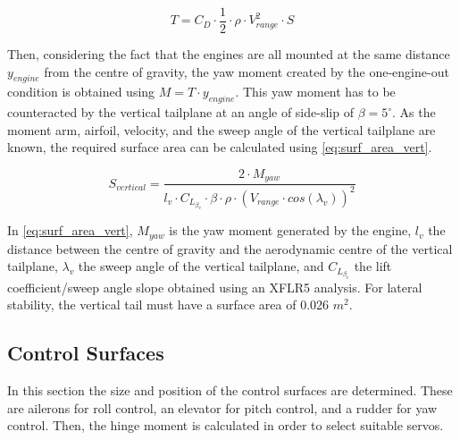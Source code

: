 \begin{equation}
    T = C_D\cdot\frac{1}{2}\cdot\rho\cdot V^2_{range}\cdot S
    \label{eq:drag_vertical}
\end{equation}

Then, considering the fact that the engines are all mounted at the same distance $y_{engine}$ from the centre of gravity, the yaw moment created by the one-engine-out condition is obtained using $M = T\cdot y_{engine}$. This yaw moment has to be counteracted by the vertical tailplane at an angle of side-slip of $\beta = 5^\circ$. As the moment arm, airfoil, velocity, and the sweep angle of the vertical tailplane are known, the required surface area can be calculated using \autoref{eq:surf_area_vert}.


\begin{equation}
    S_{vertical} = \frac{2\cdot M_{yaw}}{l_v\cdot C_{L_{\beta_v}}\cdot \beta\cdot\rho\cdot (V_{range}\cdot cos(\lambda_{v}))^2}
    \label{eq:surf_area_vert}
\end{equation}

In \autoref{eq:surf_area_vert}, $M_{yaw}$ is the yaw moment generated by the engine, $l_v$ the distance between the centre of gravity and the aerodynamic centre of the vertical tailplane, $\lambda_v$ the sweep angle of the vertical tailplane, and $C_{L_{\beta_v}}$ the lift coefficient/sweep angle slope obtained using an XFLR5 analysis. For lateral stability, the vertical tail must have a surface area of 0.026 $m^2$.







\subsection{Control Surfaces}

In this section the size and position of the control surfaces are determined. These are ailerons for roll control, an elevator for pitch control, and a rudder for yaw control. Then, the hinge moment is calculated in order to select suitable servos. 

